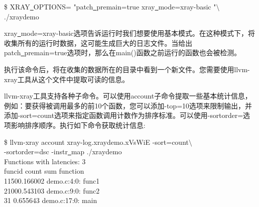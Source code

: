 \begin{tcolorbox}[colback=white,colframe=black]
\$ XRAY\underline{~}OPTIONS= "patch\underline{~}premain=true xray\underline{~}mode=xray-basic "$\setminus$ \\
./xraydemo
\end{tcolorbox}

xray\underline{~}mode=xray-basic选项告诉运行时我们想要使用基本模式。在这种模式下，将收集所有的运行时数据，这可能生成巨大的日志文件。当给出patch\underline{~}premain=true选项时，那么在main()函数之前运行的函数也会被检测。\par

执行该命令后，将在收集的数据所在的目录中看到一个新文件。您需要使用llvm-xray工具从这个文件中提取可读的信息。\par

llvm-xray工具支持各种子命令。可以使用account子命令提取一些基本统计信息，例如：要获得被调用最多的前10个函数，您可以添加-top=10选项来限制输出，并添加-sort=count选项来指定函数调用计数作为排序标准。可以使用-sortorder=选项影响排序顺序。执行如下命令获取统计信息:\par

\begin{tcolorbox}[colback=white,colframe=black]
\$ llvm-xray account xray-log.xraydemo.xVsWiE -sort=count$\setminus$ \\
\hspace*{0.5cm}-sortorder=dsc -instr\underline{~}map ./xraydemo \\
Functions with latencies: 3 \\
\hspace*{0.5cm}funcid \hspace{1cm}count \hspace{2cm}sum \hspace{1cm}function \\
\hspace*{1.4cm}1\hspace{1.4cm}150\hspace{1.4cm}0.166002 \hspace{1cm}demo.c:4:0: func1 \\
\hspace*{1.4cm}2\hspace{1.4cm}100\hspace{1.4cm}0.543103 \hspace{1cm}demo.c:9:0: func2 \\
\hspace*{1.4cm}3\hspace{1.8cm}1 \hspace{1.3cm}0.655643 \hspace{1cm}demo.c:17:0: main
\end{tcolorbox}

